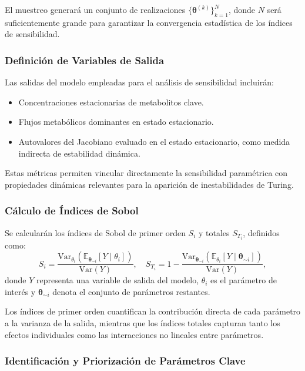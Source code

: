\documentclass[12pt,spanish]{article}
\begin{document}
	El muestreo generará un conjunto de realizaciones $\{\boldsymbol{\theta}^{(k)}\}_{k=1}^N$, donde $N$ será suficientemente grande para garantizar la convergencia estadística de los índices de sensibilidad.
	
	\subsubsection*{Definición de Variables de Salida}
	
	Las salidas del modelo empleadas para el análisis de sensibilidad incluirán:
	\begin{itemize}
		\item Concentraciones estacionarias de metabolitos clave.
		\item Flujos metabólicos dominantes en estado estacionario.
		\item Autovalores del Jacobiano evaluado en el estado estacionario, como medida indirecta de estabilidad dinámica.
	\end{itemize}
	
	Estas métricas permiten vincular directamente la sensibilidad paramétrica con propiedades dinámicas relevantes para la aparición de inestabilidades de Turing.
	
	\subsubsection*{Cálculo de Índices de Sobol}
	
	Se calcularán los índices de Sobol de primer orden $S_i$ y totales $S_{T_i}$, definidos como:
	\[
	S_i = \frac{\mathrm{Var}_{\theta_i}\left( \mathbb{E}_{\boldsymbol{\theta}_{\sim i}}[Y \mid \theta_i] \right)}{\mathrm{Var}(Y)}, \quad
	S_{T_i} = 1 - \frac{\mathrm{Var}_{\boldsymbol{\theta}_{\sim i}}\left( \mathbb{E}_{\theta_i}[Y \mid \boldsymbol{\theta}_{\sim i}] \right)}{\mathrm{Var}(Y)},
	\]
	donde $Y$ representa una variable de salida del modelo, $\theta_i$ es el parámetro de interés y $\boldsymbol{\theta}_{\sim i}$ denota el conjunto de parámetros restantes.
	
	Los índices de primer orden cuantifican la contribución directa de cada parámetro a la varianza de la salida, mientras que los índices totales capturan tanto los efectos individuales como las interacciones no lineales entre parámetros.
	
	\subsubsection*{Identificación y Priorización de Parámetros Clave}
	
\end{document}
